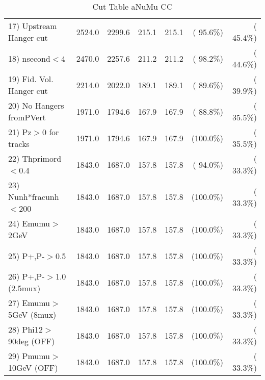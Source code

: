 \begin{table}[h!]
\begin{tabular}{||l||r|r|r|r|r|r||}
 17) Upstream Hanger cut  &       2524.0 &       2299.6 &        215.1 &        215.1 & ( 95.6\%) & ( 45.4\%) \\
 18) nsecond$<$4          &       2470.0 &       2257.6 &        211.2 &        211.2 & ( 98.2\%) & ( 44.6\%) \\
 19) Fid. Vol. Hanger cut &       2214.0 &       2022.0 &        189.1 &        189.1 & ( 89.6\%) & ( 39.9\%) \\
 20) No Hangers fromPVert &       1971.0 &       1794.6 &        167.9 &        167.9 & ( 88.8\%) & ( 35.5\%) \\
 21) Pz$>$0 for tracks    &       1971.0 &       1794.6 &        167.9 &        167.9 & (100.0\%) & ( 35.5\%) \\
 22) Thprimord$<$0.4      &       1843.0 &       1687.0 &        157.8 &        157.8 & ( 94.0\%) & ( 33.3\%) \\
 23) Nunh*fracunh$<$200   &       1843.0 &       1687.0 &        157.8 &        157.8 & (100.0\%) & ( 33.3\%) \\
 24) Emumu$>$2GeV         &       1843.0 &       1687.0 &        157.8 &        157.8 & (100.0\%) & ( 33.3\%) \\
 25) P+,P-$>$0.5          &       1843.0 &       1687.0 &        157.8 &        157.8 & (100.0\%) & ( 33.3\%) \\
 26) P+,P-$>$1.0 (2.5mux) &       1843.0 &       1687.0 &        157.8 &        157.8 & (100.0\%) & ( 33.3\%) \\
 27) Emumu$>$5GeV  (8mux) &       1843.0 &       1687.0 &        157.8 &        157.8 & (100.0\%) & ( 33.3\%) \\
 28) Phi12$>$90deg  (OFF) &       1843.0 &       1687.0 &        157.8 &        157.8 & (100.0\%) & ( 33.3\%) \\
 29) Pmumu$>$10GeV  (OFF) &       1843.0 &       1687.0 &        157.8 &        157.8 & (100.0\%) & ( 33.3\%) \\
 \hline
 \hline
 \end{tabular}
 \caption{Cut Table  aNuMu CC }
 \label{tab-cutcohjpsi-mumu_anumucc}
 \end{table}
